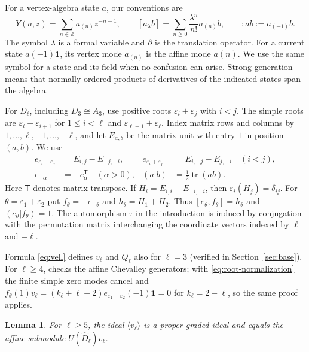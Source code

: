 \documentclass[11pt]{article}
\newtheorem{lemma}[theorem]{Lemma}
\begin{document}
For a vertex-algebra state $a$, our conventions are
$$
 Y(a,z)=\sum_{n\in\mathbb Z}a_{(n)}z^{-n-1},\qquad
 [a{}_{\lambda}b]=\sum_{n\ge0}\frac{\lambda^n}{n!}a_{(n)}b,
 \qquad :ab:=a_{(-1)}b.
$$
The symbol $\lambda$ is a formal variable and $\partial$ is the translation
operator.  For a current state $a(-1)\mathbf1$, its vertex mode $a_{(n)}$
is the affine mode $a(n)$.  We use the same symbol for a state and its
field when no confusion can arise.  Strong generation means that normally
ordered products of derivatives of the indicated states span the algebra.

For $D_\ell$, including $D_3\cong A_3$, use positive roots
$\varepsilon_i\pm\varepsilon_j$ with $i<j$.  The simple roots are
$\varepsilon_i-\varepsilon_{i+1}$ for $1\le i<\ell$ and
$\varepsilon_{\ell-1}+\varepsilon_\ell$.
Index matrix rows and columns by $1,\ldots,\ell,-1,\ldots,-\ell$, and let
$E_{a,b}$ be the matrix unit with entry $1$ in position $(a,b)$.
We use
\begin{equation}\label{eq:root-normalization}
 \begin{aligned}
 e_{\varepsilon_i-\varepsilon_j}&=E_{i,j}-E_{-j,-i},&
 e_{\varepsilon_i+\varepsilon_j}&=E_{i,-j}-E_{j,-i}\quad(i<j),\\
 e_{-\alpha}&=-e_\alpha^{\mathsf T}\quad(\alpha>0),&
 (a|b)&=\tfrac12\operatorname{tr}(ab).
 \end{aligned}
\end{equation}
Here $\mathsf T$ denotes matrix transpose.  If $H_i=E_{i,i}-E_{-i,-i}$,
then $\varepsilon_i(H_j)=\delta_{ij}$.
For $\theta=\varepsilon_1+\varepsilon_2$ put
$f_\theta=-e_{-\theta}$ and $h_\theta=H_1+H_2$.
Thus $[e_\theta,f_\theta]=h_\theta$ and $(e_\theta|f_\theta)=1$.
The automorphism $\tau$ in the introduction is induced by conjugation with
the permutation matrix interchanging the coordinate vectors indexed by
$\ell$ and $-\ell$.

Formula \eqref{eq:vell} defines $v_\ell$ and $Q_\ell$ also for $\ell=3$
(verified in Section~\ref{sec:base}).  For $\ell\ge4$,
\cite[Theorem~3.1]{PerseD} checks the affine Chevalley generators; with
\eqref{eq:root-normalization} the finite simple zero modes cancel and
$f_\theta(1)v_\ell=(k_\ell+\ell-2)e_{\varepsilon_1-\varepsilon_2}(-1)\mathbf1=0$
for $k_\ell=2-\ell$, so the same proof applies.

\begin{lemma}\label{lem:proper}
For $\ell\ge5$, the ideal $\langle v_\ell\rangle$ is a proper graded ideal and equals
the affine submodule $U(\widehat{D}_\ell)v_\ell$.
\end{lemma}
\end{document}
